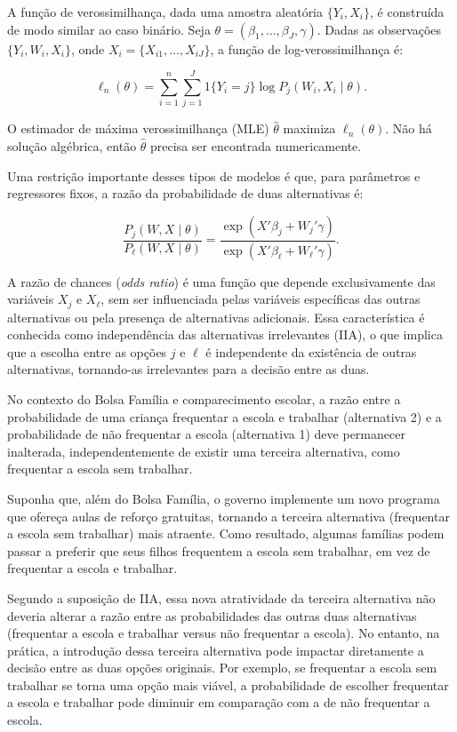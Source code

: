 \documentclass[12pt, a4paper, openany]{book}
\numberwithin{equation}{chapter}
\numberwithin{table}{chapter}
\numberwithin{figure}{chapter}
\theoremstyle{break}
\begin{document}
A função de verossimilhança, dada uma amostra aleatória \( \{Y_i, X_i\} \), é construída de modo similar ao caso binário. Seja \( \theta = ({\beta}_1, \dots, {\beta}_J, {\gamma}) \). Dadas as observações \( \{Y_i, W_i, X_i\} \), onde \( X_i = \{X_{i1}, \dots, X_{iJ}\} \), a função de log-verossimilhança é:

\[
\ell_n(\theta) = \sum_{i=1}^{n} \sum_{j=1}^{J} 1\{Y_i = j\} \log P_j(W_i, X_i \mid \theta).
\]

O estimador de máxima verossimilhança (MLE) \( \hat{\theta} \) maximiza \( \ell_n(\theta) \). Não há solução algébrica, então \( \hat{\theta} \) precisa ser encontrada numericamente.

Uma restrição importante desses tipos de modelos é que, para parâmetros e regressores fixos, a razão da probabilidade de duas alternativas é:

\[
\frac{P_j(W, X \mid \theta)}{P_\ell(W, X \mid \theta)} = \frac{\exp\left( {X}' {\beta}_j + {W}_j' {\gamma} \right)}{\exp\left( {X}' {\beta}_\ell + {W}_\ell' {\gamma} \right)}.
\]

A razão de chances (\textit{odds ratio}) é uma função que depende exclusivamente das variáveis \( {X}_j \) e \( {X}_\ell \), sem ser influenciada pelas variáveis específicas das outras alternativas ou pela presença de alternativas adicionais. Essa característica é conhecida como independência das alternativas irrelevantes (IIA), o que implica que a escolha entre as opções \( j \) e \( \ell \) é independente da existência de outras alternativas, tornando-as irrelevantes para a decisão entre as duas.

No contexto do Bolsa Família e comparecimento escolar, a razão entre a probabilidade de uma criança frequentar a escola e trabalhar (alternativa 2) e a probabilidade de não frequentar a escola (alternativa 1) deve permanecer inalterada, independentemente de existir uma terceira alternativa, como frequentar a escola sem trabalhar.

Suponha que, além do Bolsa Família, o governo implemente um novo programa que ofereça aulas de reforço gratuitas, tornando a terceira alternativa (frequentar a escola sem trabalhar) mais atraente. Como resultado, algumas famílias podem passar a preferir que seus filhos frequentem a escola sem trabalhar, em vez de frequentar a escola e trabalhar.

Segundo a suposição de IIA, essa nova atratividade da terceira alternativa não deveria alterar a razão entre as probabilidades das outras duas alternativas (frequentar a escola e trabalhar versus não frequentar a escola). No entanto, na prática, a introdução dessa terceira alternativa pode impactar diretamente a decisão entre as duas opções originais. Por exemplo, se frequentar a escola sem trabalhar se torna uma opção mais viável, a probabilidade de escolher frequentar a escola e trabalhar pode diminuir em comparação com a de não frequentar a escola.
\end{document}
